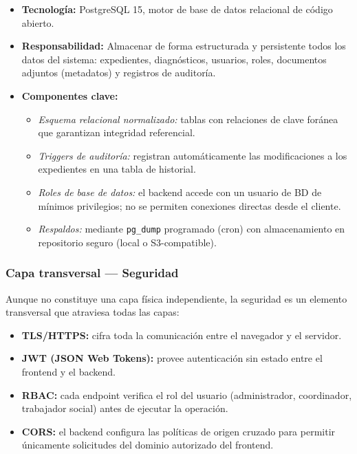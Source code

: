 \begin{itemize}
	\item \textbf{Tecnología:} PostgreSQL 15, motor de base de datos relacional de código
	abierto.
	\item \textbf{Responsabilidad:} Almacenar de forma estructurada y persistente todos
	los datos del sistema: expedientes, diagnósticos, usuarios, roles, documentos
	adjuntos (metadatos) y registros de auditoría.
	\item \textbf{Componentes clave:}
	\begin{itemize}
		\item \textit{Esquema relacional normalizado:} tablas con relaciones de clave
		foránea que garantizan integridad referencial.
		\item \textit{Triggers de auditoría:} registran automáticamente las
		modificaciones a los expedientes en una tabla de historial.
		\item \textit{Roles de base de datos:} el backend accede con un usuario de BD
		de mínimos privilegios; no se permiten conexiones directas desde el cliente.
		\item \textit{Respaldos:} mediante \texttt{pg\_dump} programado (cron) con
		almacenamiento en repositorio seguro (local o S3-compatible).
	\end{itemize}
\end{itemize}

\subsubsection*{Capa transversal — Seguridad}

Aunque no constituye una capa física independiente, la seguridad es un elemento
transversal que atraviesa todas las capas:

\begin{itemize}
	\item \textbf{TLS/HTTPS:} cifra toda la comunicación entre el navegador y el servidor.
	\item \textbf{JWT (JSON Web Tokens):} provee autenticación sin estado entre el
	frontend y el backend.
	\item \textbf{RBAC:} cada endpoint verifica el rol del usuario (administrador,
	coordinador, trabajador social) antes de ejecutar la operación.
	\item \textbf{CORS:} el backend configura las políticas de origen cruzado para
	permitir únicamente solicitudes del dominio autorizado del frontend.
\end{itemize}

